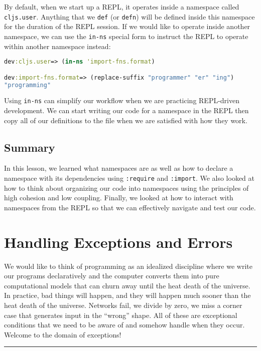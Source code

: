 \documentclass[10pt,twoside,openright]{memoir}
\begin{document}
By default, when we start up a REPL, it operates inside a namespace
called \texttt{cljs.user}. Anything that we \texttt{def} (or
\texttt{defn}) will be defined inside this namespace for the duration of
the REPL session. If we would like to operate inside another namespace,
we can use the \texttt{in-ns} special form to instruct the REPL to
operate within another namespace instead:

\begin{lstlisting}[language=Clojure]
dev:cljs.user=> (in-ns 'import-fns.format)

dev:import-fns.format=> (replace-suffix "programmer" "er" "ing")
"programming"
\end{lstlisting}

Using \texttt{in-ns} can simplify our workflow when we are practicing
REPL-driven development. We can start writing our code for a namespace
in the REPL then copy all of our definitions to the file when we are
satisfied with how they work.


\section{Summary}

In this lesson, we learned what namespaces are as well as how to declare
a namespace with its dependencies using \texttt{:require} and
\texttt{:import}. We also looked at how to think about organizing our
code into namespaces using the principles of high cohesion and low
coupling. Finally, we looked at how to interact with namespaces from the
REPL so that we can effectively navigate and test our code.

\chapter{Handling Exceptions and Errors}

We would like to think of programming as an idealized discipline where
we write our programs declaratively and the computer converts them into
pure computational models that can churn away until the heat death of
the universe. In practice, bad things will happen, and they will happen
much sooner than the heat death of the universe. Networks fail, we
divide by zero, we miss a corner case that generates input in the
``wrong'' shape. All of these are exceptional conditions that we need to
be aware of and somehow handle when they occur. Welcome to the domain of
exceptions!

\begin{center}\rule{0.5\linewidth}{0.5pt}\end{center}
\end{document}

